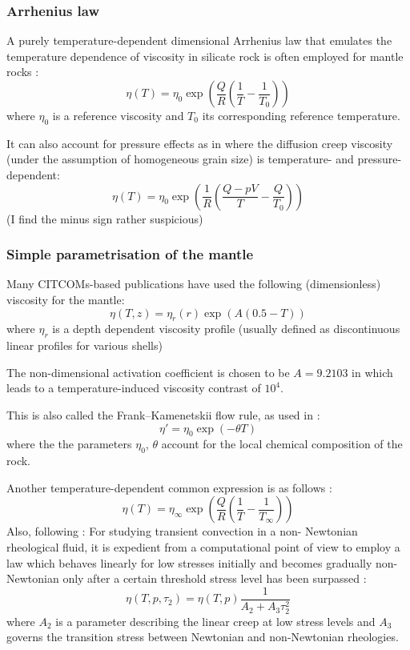 \Literature \cite{basv06,buro11,faff11,gagd14,gery10,goev79,kaka08,kako09,kary01,mesk10,zhwa13,chsm18}

\subsubsection{Arrhenius law}

A purely temperature-dependent dimensional Arrhenius law that emulates the temperature
dependence of viscosity in silicate rock is often employed for mantle rocks 
\cite{albe00,zhzm09,vata11,bogs13b,namu13,boba19,gult19}:
\begin{equation}
\eta(T)=\eta_0 \exp \left( \frac{Q}{R}(\frac{1}{T}-\frac{1}{T_0}) \right)
\end{equation}
where $\eta_0$ is a reference viscosity and $T_0$ its corresponding reference 
temperature.

It can also account for pressure effects as in \cite{lorg18} where the
diffusion creep viscosity (under the assumption of homogeneous grain size)
is temperature- and pressure-dependent:
\[
\eta(T)=\eta_0 \exp \left( \frac{1}{R}(\frac{Q-pV}{T}-\frac{Q}{T_0}) \right)
\]
(I find the minus sign rather suspicious)

\subsubsection{Simple parametrisation of the mantle}

Many CITCOMs-based publications \cite{bumb10,budt14} 
have used the following (dimensionless) viscosity for the mantle:
\[
\eta(T,z) = \eta_r(r) \exp(A(0.5-T))
\]
where $\eta_r$ is a depth dependent viscosity profile (usually defined as 
discontinuous linear profiles for various shells)

The non-dimensional activation coefficient is chosen to be $A=9.2103$ in 
\cite{budt14} which leads to a temperature-induced viscosity contrast of $10^4$.

This is also called the Frank–Kamenetskii flow rule, as used in \cite{lemh17}:
\[
\eta' = \eta_0 \exp(-\theta T)
\]
where the the parameters $\eta_0$, $\theta$ account for the local chemical composition of the rock.

Another temperature-dependent common expression is as follows \cite{flyu84}:
\[
\eta(T)=\eta_\infty \exp \left( \frac{Q}{R}(\frac{1}{T}-\frac{1}{T_\infty} ) \right)
\]
Also, following \cite{flyu84}: For studying transient convection in a non-
Newtonian rheological fluid, it is expedient from a
computational point of view to employ a law
which behaves linearly for low stresses initially
and becomes gradually non-Newtonian only after
a certain threshold stress level has been surpassed \cite{chri84,chyu84}:
\[
\eta(T,p,\tau_2) =\eta(T,p) \frac{1}{A_2 + A_3 \tau_2^2}
\]
where $A_2$ is a parameter describing the linear creep
at low stress levels and $A_3$ governs the transition
stress between Newtonian and non-Newtonian rheologies.

